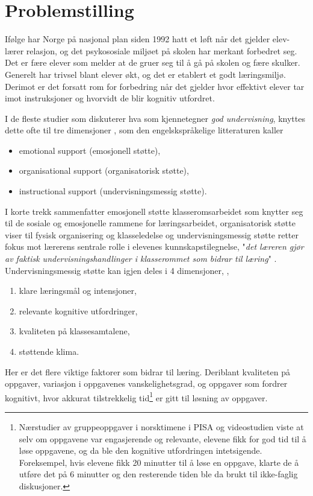 \documentclass[main.tex]{subfiles}
\begin{document}
\section{Problemstilling}
Ifølge  har Norge på nasjonal plan siden 1992 hatt et løft når det gjelder elev-lærer 
relasjon, og det psykososiale miljøet på skolen har merkant forbedret seg. Det er fære elever 
som melder at de gruer seg til å gå på skolen og fære skulker. Generelt har trivsel 
blant elever økt, og det er etablert et godt læringsmiljø. Derimot er det forsatt rom for forbedring 
når det gjelder hvor effektivt elever tar imot instruksjoner og hvorvidt de blir kognitiv utfordret. 
\newline

I de fleste studier som diskuterer hva som kjennetegner \emph{god undervisning}, knyttes 
dette ofte til tre dimensjoner , som den engelskspråkelige litteraturen kaller 
\begin{itemize}
\item emotional support (emosjonell støtte),
\item organisational support (organisatorisk støtte),
\item instructional support (undervisningsmessig støtte).
\end{itemize}
I korte trekk sammenfatter emosjonell støtte klasseromsarbeidet som knytter
seg til de sosiale og emosjonelle rammene for læringsarbeidet, %
organisatorisk støtte viser til fysisk organisering og klasseledelse %
og undervisningsmessig støtte retter fokus mot lærerens sentrale rolle i elevenes kunnskapstilegnelse, 
"\emph{det læreren gjør av faktisk undervisningshandlinger i klasserommet som bidrar til læring}" 
.
\newline
Undervisningsmessig støtte kan igjen deles i 4 dimensjoner, ,
\begin{enumerate}
\item klare læringsmål og intensjoner,
\item relevante kognitive utfordringer,
\item kvaliteten på klassesamtalene,
\item støttende klima.
\end{enumerate}
Her er det flere viktige faktorer som bidrar til læring. Deriblant kvaliteten på oppgaver, variasjon i
oppgavenes vanskelighetsgrad, og oppgaver som fordrer kognitivt, hvor akkurat tilstrekkelig tid\footnote{
Nærstudier av gruppeoppgaver i norsktimene i PISA og videostudien  viste at selv om oppgavene
var engasjerende og relevante, elevene fikk for god tid til å løse oppgavene, og da ble den kognitive utfordringen 
intetsigende. Foreksempel, hvis elevene fikk 20 minutter til å løse en oppgave, klarte de å utføre det på 6 
minutter og den resterende tiden ble da brukt til ikke-faglig diskusjoner.} er gitt til løsning av oppgaver. 
\end{document}
